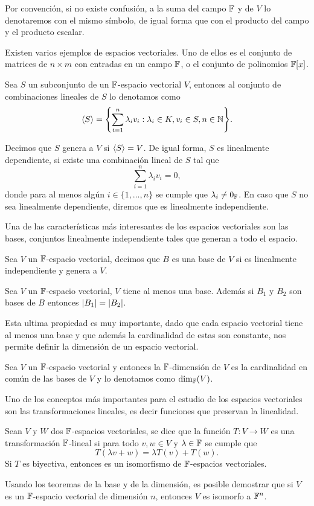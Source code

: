 Por convención, si no existe confusión, a la suma del campo $\mathbb{F}$ y de $V$ lo denotaremos con el mismo símbolo, de igual forma que con el producto del campo y el producto escalar.

Existen varios ejemplos de espacios vectoriales. Uno de ellos es el conjunto de matrices de $n \times m $ con entradas en un campo $\mathbb{F}$, o el conjunto de polinomios $\mathbb{F}[x]$.

\begin{defi}
  Sea $S$ un subconjunto de un $\mathbb{F}$-espacio vectorial $V$, entonces al conjunto de combinaciones lineales de $S$ lo denotamos como
  \[ \inner{S} = \set{ \sum_{i=1}^n \lambda_i v_i : \lambda_i \in K,  v_i \in S, n \in \N  }. \]

  Decimos que $S$ genera a $V$ si $\langle S\rangle = V$. De igual forma, $S$ es linealmente dependiente, si existe una combinación lineal de $S$ tal que
  \[ \sum_{i=1}^n \lambda_i v_i = 0, \]
  donde para al menos algún $i \in \{1,\ldots,n\}$ se cumple que $\lambda_i \neq 0_{\mathbb{F}}$. En caso que $S$ no sea linealmente dependiente, diremos que es linealmente independiente.
\end{defi}

Una de las características más interesantes de los espacios vectoriales son las bases, conjuntos linealmente independiente tales que generan a todo el espacio.
\begin{defi}
  Sea $V$ un $\mathbb{F}$-espacio vectorial, decimos que $B$ es una base de $V$ si es linealmente independiente y genera a $V$.
\end{defi}

\begin{teor}
  Sea $V$ un $\mathbb{F}$-espacio vectorial, $V$ tiene al menos una base. Además si $B_1$ y $B_2$ son bases de $B$ entonces $\mathopen|B_1\mathclose| = \mathopen|B_2\mathclose|$.
\end{teor}

Esta ultima propiedad es muy importante, dado que cada espacio vectorial tiene al menos una base y que además la cardinalidad de estas son constante, nos permite definir la dimensión de un espacio vectorial.

\begin{defi}
  Sea $V$ un $\mathbb{F}$-espacio vectorial y entonces la $\mathbb{F}$-dimensión de $V$ es la cardinalidad en común de las bases de $V$ y lo denotamos como $\dim_{\mathbb{F}}(V)$.
\end{defi}

Uno de los conceptos más importantes para el estudio de los espacios vectoriales son las transformaciones lineales, es decir funciones que preservan la linealidad.

\begin{defi}
  Sean $V$ y $W$ dos $\mathbb{F}$-espacios vectoriales, se dice que la función $T\colon V\to W$ es una transformación $\mathbb{F}$-lineal si para todo $v,w \in V$ y $\lambda \in \mathbb{F}$ se cumple que 
  \[ T(\lambda v + w) = \lambda T(v) + T(w).\]
  Si $T$ es biyectiva, entonces es un isomorfismo de $\mathbb{F}$-espacios vectoriales.
\end{defi}

Usando los teoremas de la base y de la dimensión, es posible demostrar que si $V$ es un $\mathbb{F}$-espacio vectorial de dimensión $n$, entonces $V$ es isomorfo a $\mathbb{F}^n$.